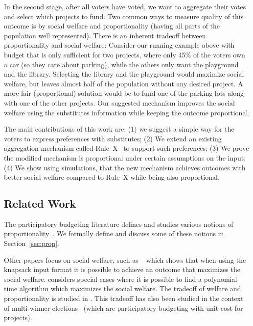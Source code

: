\documentclass[runningheads]{llncs}
\begin{document}
In the second stage, after all voters have voted, we want to aggregate their votes and select which projects to fund.
Two common ways to measure quality of this outcome  is by social welfare and proportionality  (having all parts of the population well represented).
% 
There is an inherent tradeoff between proportionality and social welfare: Consider our running example above with budget that is only sufficient for two projects, where only 45\% of the voters own a car (so they care about parking), while the others only want the playground and the library. Selecting the library and the playground would maximize social welfare, but leaves almost half of the population without any desired project. A more fair (proportional) solution would be to fund one of the parking lots along with one of the other projects. 
 Our suggested mechanism  improves the social welfare using the substitutes information while keeping the outcome  proportional.


The main contributions of this work are: (1) we suggest a simple way for the voters to  express preferences with substitutes; (2) We extend an existing aggregation mechanism called Rule~X~\cite{peters2020proportional} to support such preferences; (3) We prove the modified mechanism is proportional under certain assumptions on the input; (4) We show using simulations, that the new mechanism achieves outcomes with better social welfare compared to Rule~X while being also proportional.



\subsection{Related Work}
The participatory budgeting literature defines and studies various notions of proportionality~\cite{peters2020proportional, fain2016core, fain2018fair, aziz2017proportionally, aziz2017justified, sanchez2016proportional, skowron2020participatory}. We formally define and discuss some of these notions in Section~\ref{sec:prop}.

Other papers focus on social welfare, such as  ~\citet{goel2019knapsack} which shows that when using the  knapsack input format  it is possible to achieve an outcome that maximizes the social welfare.
 \citet{jain2020participatory} considers special cases where it is possible to find a polynomial time algorithm which maximizes the social welfare. 
The tradeoff of welfare and proportionality is studied in \cite{michorzewski2020price}. %
This tradeoff has also been studied in the context of multi-winner elections~\cite{skowron2018proportionality, lackner2020utilitarian} (which are participatory budgeting with unit cost for projects).
\end{document}
